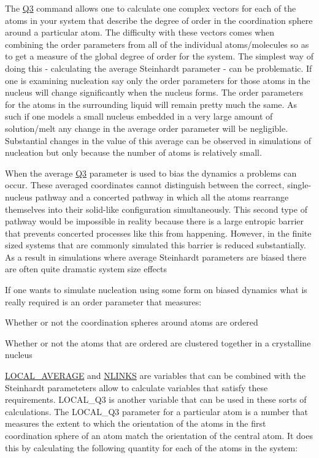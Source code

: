 The \hyperlink{Q3}{Q3} command allows one to calculate one complex vectors for each of the atoms in your system that describe the degree of order in the coordination sphere around a particular atom. The difficulty with these vectors comes when combining the order parameters from all of the individual atoms/molecules so as to get a measure of the global degree of order for the system. The simplest way of doing this -\/ calculating the average Steinhardt parameter -\/ can be problematic. If one is examining nucleation say only the order parameters for those atoms in the nucleus will change significantly when the nucleus forms. The order parameters for the atoms in the surrounding liquid will remain pretty much the same. As such if one models a small nucleus embedded in a very large amount of solution/melt any change in the average order parameter will be negligible. Substantial changes in the value of this average can be observed in simulations of nucleation but only because the number of atoms is relatively small.

When the average \hyperlink{Q3}{Q3} parameter is used to bias the dynamics a problems can occur. These averaged coordinates cannot distinguish between the correct, single-\/nucleus pathway and a concerted pathway in which all the atoms rearrange themselves into their solid-\/like configuration simultaneously. This second type of pathway would be impossible in reality because there is a large entropic barrier that prevents concerted processes like this from happening. However, in the finite sized systems that are commonly simulated this barrier is reduced substantially. As a result in simulations where average Steinhardt parameters are biased there are often quite dramatic system size effects

If one wants to simulate nucleation using some form on biased dynamics what is really required is an order parameter that measures\+:


\begin{DoxyItemize}
\item Whether or not the coordination spheres around atoms are ordered
\item Whether or not the atoms that are ordered are clustered together in a crystalline nucleus
\end{DoxyItemize}

\hyperlink{LOCAL_AVERAGE}{L\+O\+C\+A\+L\+\_\+\+A\+V\+E\+R\+A\+G\+E} and \hyperlink{NLINKS}{N\+L\+I\+N\+K\+S} are variables that can be combined with the Steinhardt parameteters allow to calculate variables that satisfy these requirements. L\+O\+C\+A\+L\+\_\+\+Q3 is another variable that can be used in these sorts of calculations. The L\+O\+C\+A\+L\+\_\+\+Q3 parameter for a particular atom is a number that measures the extent to which the orientation of the atoms in the first coordination sphere of an atom match the orientation of the central atom. It does this by calculating the following quantity for each of the atoms in the system\+:

